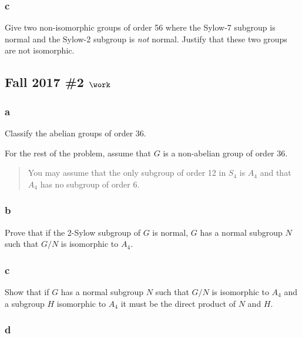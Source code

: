 \hypertarget{c-5}{%
\subsubsection{c}\label{c-5}}

Give two non-isomorphic groups of order 56 where the Sylow-7 subgroup is
normal and the Sylow-2 subgroup is \emph{not} normal. Justify that these
two groups are not isomorphic.

\hypertarget{fall-2017-2-work}{%
\subsection{\texorpdfstring{Fall 2017 \#2
\(\work\)}{Fall 2017 \#2 \textbackslash work}}\label{fall-2017-2-work}}

\hypertarget{a-8}{%
\subsubsection{a}\label{a-8}}

Classify the abelian groups of order 36.

For the rest of the problem, assume that \(G\) is a non-abelian group of
order 36.

\begin{quote}
You may assume that the only subgroup of order 12 in \(S_4\) is \(A_4\)
and that \(A_4\) has no subgroup of order 6.
\end{quote}

\hypertarget{b-8}{%
\subsubsection{b}\label{b-8}}

Prove that if the 2-Sylow subgroup of \(G\) is normal, \(G\) has a
normal subgroup \(N\) such that \(G/N\) is isomorphic to \(A_4\).

\hypertarget{c-6}{%
\subsubsection{c}\label{c-6}}

Show that if \(G\) has a normal subgroup \(N\) such that \(G/N\) is
isomorphic to \(A_4\) and a subgroup \(H\) isomorphic to \(A_4\) it must
be the direct product of \(N\) and \(H\).

\hypertarget{d-2}{%
\subsubsection{d}\label{d-2}}

